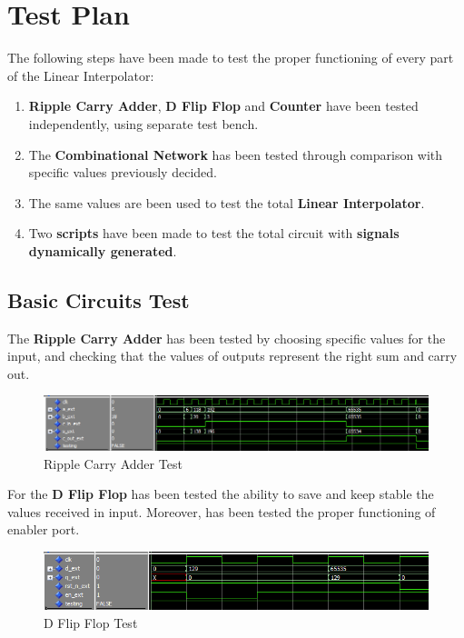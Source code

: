 \section{Test Plan}

The following steps have been made to test the proper functioning of every part of the Linear Interpolator:

\begin{enumerate}
    \item \textbf{Ripple Carry Adder}, \textbf{D Flip Flop} and \textbf{Counter} have been tested independently, using separate test bench.
    \item The \textbf{Combinational Network} has been tested through comparison with specific values previously decided.
    \item The same values are been used to test the total \textbf{Linear Interpolator}.
    \item Two \textbf{scripts} have been made to test the total circuit with \textbf{signals dynamically generated}.
\end{enumerate}

\subsection{Basic Circuits Test}

The \textbf{Ripple Carry Adder} has been tested by choosing specific values for the input, and checking that the values of outputs represent the right sum and carry out.

\begin{figure}[H]
    \centering
    \includegraphics[width=1\textwidth]{img/Chapter4/rca.png}
    \caption{Ripple Carry Adder Test}
    \label{fig:RCATest}
\end{figure}

For the \textbf{D Flip Flop} has been tested the ability to save and keep stable the values received in input. Moreover, has been tested the proper functioning of enabler port.

\begin{figure}[H]
    \centering
    \includegraphics[width=1\textwidth]{img/Chapter4/dff.png}
    \caption{D Flip Flop Test}
    \label{fig:DFFTest}
\end{figure}

